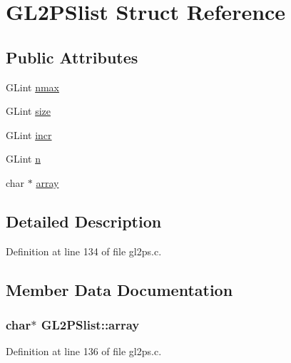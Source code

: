 \hypertarget{struct_g_l2_p_slist}{}\section{G\+L2\+P\+Slist Struct Reference}
\label{struct_g_l2_p_slist}
\subsection*{Public Attributes}
\begin{DoxyCompactItemize}
\item 
G\+Lint \hyperlink{struct_g_l2_p_slist_a5c25dd9337d4f558c344863e9bbac025}{nmax}
\item 
G\+Lint \hyperlink{struct_g_l2_p_slist_adf2704c02cef1fb58ab86a1b3e629ec1}{size}
\item 
G\+Lint \hyperlink{struct_g_l2_p_slist_aee2160e9aa439af185d48f723b1a6b59}{incr}
\item 
G\+Lint \hyperlink{struct_g_l2_p_slist_a1d0803211695ce7240a1e6fa832b868e}{n}
\item 
char $\ast$ \hyperlink{struct_g_l2_p_slist_aa31a2838540b82065617ec0bdd6d613b}{array}
\end{DoxyCompactItemize}


\subsection{Detailed Description}


Definition at line 134 of file gl2ps.\+c.



\subsection{Member Data Documentation}
\hypertarget{struct_g_l2_p_slist_aa31a2838540b82065617ec0bdd6d613b}{}
\subsubsection[{array}]{\setlength{\rightskip}{0pt plus 5cm}char$\ast$ G\+L2\+P\+Slist\+::array}\label{struct_g_l2_p_slist_aa31a2838540b82065617ec0bdd6d613b}


Definition at line 136 of file gl2ps.\+c.

\hypertarget{struct_g_l2_p_slist_aee2160e9aa439af185d48f723b1a6b59}{}
